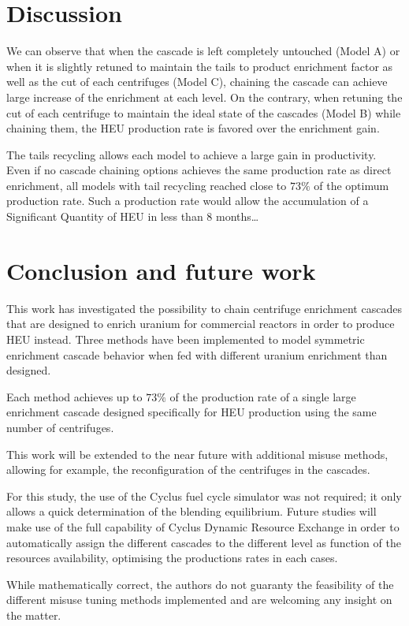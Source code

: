 \section{Discussion}

We can observe that when the cascade is left completely untouched (Model A) or
when it is slightly retuned to maintain the tails to product enrichment factor
as well as the cut of each centrifuges (Model C), chaining the cascade can
achieve large increase of the enrichment at each level.  On the contrary, when
retuning the cut of each centrifuge to maintain the ideal state of the cascades
(Model B) while chaining them, the \gls{HEU} production rate is favored over the
enrichment gain.

The tails recycling allows each model to achieve a large gain in productivity.
Even if no cascade chaining options achieves the same production rate as direct
enrichment, all models with tail recycling reached close to $73\%$ of the optimum
production rate. Such a production rate would allow the accumulation of a
Significant Quantity of \gls{HEU} in less than 8 months\ldots


\section{Conclusion and future work}

This work has investigated the possibility to chain centrifuge enrichment
cascades that are designed to enrich uranium for commercial reactors in order to
produce \gls{HEU} instead. Three methods have been implemented to model
symmetric enrichment cascade behavior when fed with different uranium enrichment
than designed. 

Each method achieves up to $73\%$ of the production rate of a single
large enrichment cascade designed specifically for \gls{HEU} production using
the same number of centrifuges.

This work will be extended to the near future with additional misuse methods,
allowing for example, the reconfiguration of the centrifuges in the cascades.

For this study, the use of the Cyclus fuel cycle simulator was not required;
it only allows a quick determination of the blending equilibrium. Future
studies will make use of the full capability of Cyclus Dynamic Resource
Exchange in order to automatically assign the different cascades to the
different level as function of the resources availability, optimising the
productions rates in each cases.

While mathematically correct, the authors do not guaranty the feasibility of the
different misuse tuning methods implemented and are welcoming any insight on the
matter.


